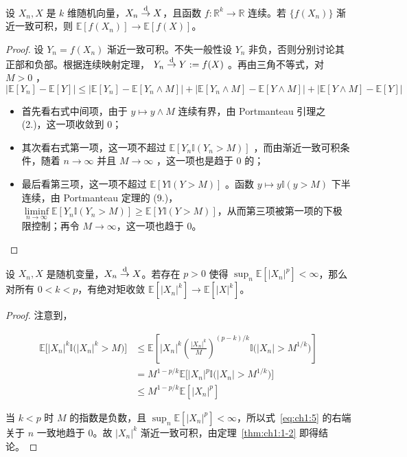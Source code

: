 \begin{theorem}\label{thm:ch1:moment-convergence}

\label{thm:ch1:1-2}设 $X_n,X$ 是 $k$ 维随机向量，$X_n\overset{\rm d}\to X$，且函数 $f:\mathbb R^k\to\mathbb R$ 连续。若 $\{f(X_n)\}$ 渐近一致可积，则 $\mathbb{E}[f(X_n)]\to\mathbb{E}[f(X)]$。

\end{theorem}

\begin{proof}

设 $Y_n=f(X_n)$ 渐近一致可积。不失一般性设 $Y_n$ 非负，否则分别讨论其正部和负部。根据连续映射定理， $Y_n\overset{\rm d}\to Y:=f(X)$ 。再由三角不等式，对 $M>0$ ， 
\[|\mathbb{E}[Y_n]-\mathbb{E}[Y]|\le |\mathbb{E}[Y_n]-\mathbb{E}[Y_n \wedge M]|+|\mathbb{E}[Y_n\wedge M]-\mathbb{E}[Y\wedge M]|+|\mathbb{E}[Y\wedge M]-\mathbb{E}[Y]|\]
\begin{itemize}
\tightlist
\item
  首先看右式中间项，由于 $y\mapsto y\wedge M$ 连续有界，由 Portmanteau 引理之 (2.)，这一项收敛到 0；
\item
  其次看右式第一项，这一项不超过 $\mathbb{E}[Y_n\mathbb I(Y_n>M)]$ ，而由渐近一致可积条件，随着 $n\to\infty$ 并且 $M\to\infty$ ，这一项也是趋于 0 的；
\item
  最后看第三项，这一项不超过 $\mathbb{E}[Y\mathbb I(Y>M)]$ 。函数 $y\mapsto y\mathbb I(y>M)$ 下半连续，由 Portmanteau 定理的 (9.)，$\liminf\limits_{n\to\infty}\mathbb{E}[Y_n\mathbb{I}(Y_n>M)]\ge \mathbb{E}[Y\mathbb{I}(Y>M)]$，从而第三项被第一项的下极限控制；再令 $M\to\infty$，这一项也趋于 0。
\end{itemize}

\end{proof}

\begin{corollary}\label{cor:ch1:absolute-moment-convergence}

\label{cor:ch1:1-3}设 $X_n,X$ 是随机变量，$X_n\overset{\rm d}\to X$。若存在 $p>0$ 使得 $\sup_n\mathbb{E}[|X_n|^p]<\infty$，那么对所有 $0<k<p$，有绝对矩收敛 $\mathbb{E}[|X_n|^k]\to\mathbb{E}[|X|^k]$。

\end{corollary}

\begin{proof}

注意到，

\begin{equation}
\label{eq:ch1:5}
\begin{aligned} \mathbb{E}\big[|X_n|^k\mathbb I\big(|X_n|^k>M\big)\big]&\le \mathbb{E}\left[|X_n|^k\left(\frac{|X_n|^k}{M}\right)^{(p-k)/k}\mathbb I\big(|X_n|>M^{1/k}\big)\right]\\ &=M^{1-p/k}\mathbb{E}\Big[|X_n|^p\mathbb I\big(|X_n|>M^{1/k}\big)\Big]\\ &\le M^{1-p/k}\mathbb{E} [|X_n|^p]\end{aligned}
\end{equation}

当 $k<p$ 时 $M$ 的指数是负数，且 $\sup_n\mathbb{E}[|X_n|^p]<\infty$，所以式~\eqref{eq:ch1:5} 的右端关于 $n$ 一致地趋于 0。故 $|X_n|^k$ 渐近一致可积，由定理~\ref{thm:ch1:1-2} 即得结论。

\end{proof}

